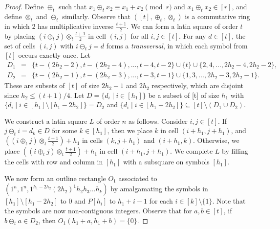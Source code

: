 \documentclass{sn-jnl}
\theoremstyle{definition}
\begin{document}
\begin{proof}
    Define $\oplus_t$ such that $x_1 \oplus_t x_2 \equiv x_1+x_2 \pmod{r}$ and $x_1 \oplus_t x_2 \in [r]$, and define $\otimes_t$ and $\ominus_t$ similarly.
    Observe that $([t],\oplus_t,\otimes_t)$ is a commutative ring in which 2 has multiplicative inverse $\frac{t+1}{2}$.
    We can form a latin square of order $t$ by placing $(i \oplus_t j) \otimes_t \frac{t+1}{2}$ in cell $(i,j)$ for all $i,j \in [t]$. For any $d\in [t]$, the set of cells $(i,j)$ with $i \ominus_t j = d$ forms a {\em transversal}, in which each symbol from $[t]$ occurs exactly once. Let 
    \begin{eqnarray*}
        D_1 &=& \{t-(2h_2-2),t-(2h_2-4),\dots,t-4,t-2\} \cup \{t\}\cup \{2,4,\dots ,2h_2-4,2h_2-2\}, \\
        D_2 &=& \{t-(2h_2-1),t-(2h_2-3),\dots ,t-3,t-1\} \cup \{1,3,\dots,2h_2-3,2h_2-1\}.
    \end{eqnarray*}
    These are subsets of $[t]$ of size $2h_2-1$ and $2h_2$ respectively, which are disjoint since $h_2 \le (t+1)/4$. Let $D=\{d_i \mid i\in [h_1]\}$ be a subset of [t] of size $h_1$ with $\{d_i \mid i \in [h_1]\setminus [h_1-2h_2]\} = D_2$ and $\{d_i \mid i \in [h_1-2h_2]\} \subseteq [t] \setminus (D_1\cup D_2)$.

    We construct a latin square $L$ of order $n$ as follows. Consider $i,j \in [t]$. If $j \ominus_t i = d_k \in D$ for some $k \in [h_1]$, then we place $k$ in cell $(i+h_1,j+h_1)$, and $((i \oplus_t j) \otimes_t \frac{t+1}{2})+h_1$ in cells $(k,j+h_1)$ and $(i+h_1,k)$. Otherwise, we place $((i \oplus_t j) \otimes_t \frac{t+1}{2})+h_1$ in cell $(i+h_1,j+h_1)$. We complete $L$ by filling the cells with row and column in $[h_1]$ with a subsquare on symbols $[h_1]$. 

    We now form an outline rectangle $O_1$ associated to $(1^n,1^n,1^{h_1-2h_2}(2h_2)^1h_2h_3\dots h_k)$ by amalgamating the symbols in $[h_1]\setminus[h_1-2h_2]$ to 0 and $P[h_i]$ to $h_1+i-1$ for each $i \in [k] \setminus \{1\}$. Note that the symbols are now non-contiguous integers. 
    Observe that for $a,b \in [t]$, if $b \ominus_t a \in D_2$, then $O_1(h_1+a,h_1+b)=\{0\}$.


\end{proof}
\end{document}
